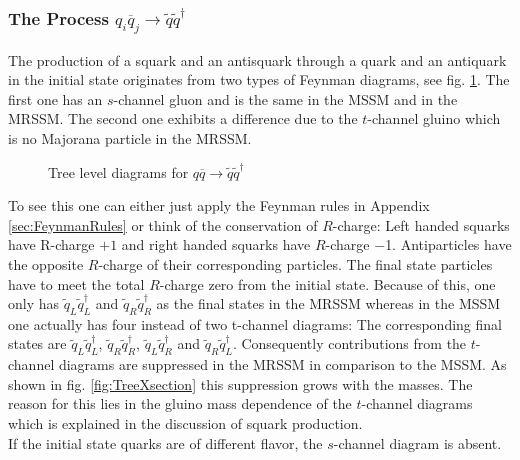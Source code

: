 \subsubsection*{The Process $q_i \overline{q}_j \to \tilde{q}\tilde{q}^\dagger$}
The production of a squark and an antisquark through a quark and an antiquark in the initial state originates from two types of Feynman diagrams, see fig. \ref{fig:squarkantisquark}. The first one has an $s$-channel gluon and is the same in the MSSM and in the MRSSM. The second one exhibits a difference due to the $t$-channel gluino which is no Majorana particle in the MRSSM. 
\begin{figure}[!htbp]
\begin{center}
\caption{Tree level diagrams for $q\overline{q} \to \tilde{q}\tilde{q}^\dagger$}\label{fig:squarkantisquark}
\end{center}
\end{figure}
To see this one can either just apply the Feynman rules in Appendix \ref{sec:FeynmanRules} or think of the conservation of $R$-charge: Left handed squarks have R-charge $+1$ and right handed squarks have $R$-charge $-$1. Antiparticles have the opposite $R$-charge of their corresponding particles. The final state particles have to meet the total $R$-charge zero from the initial state. Because of this, one only has $\tilde{q}_L \tilde{q}^\dagger_L$ and $\tilde{q}_R \tilde{q}^\dagger_R$ as the final states in the MRSSM whereas in the MSSM one actually has four instead of two t-channel diagrams: The corresponding final states are $\tilde{q}_L \tilde{q}^\dagger_L$, $\tilde{q}_R \tilde{q}^\dagger_R$, $\tilde{q}_L \tilde{q}^\dagger_R$ and $\tilde{q}_R \tilde{q}^\dagger_L$. Consequently contributions from the $t$-channel diagrams are suppressed in the MRSSM in comparison to the MSSM. As shown in fig. \ref{fig:TreeXsection} this suppression grows with the masses. The reason for this lies in the gluino mass dependence of the $t$-channel diagrams which is explained in the discussion of squark production.\\
If the initial state quarks are of different flavor, the $s$-channel diagram is absent.

